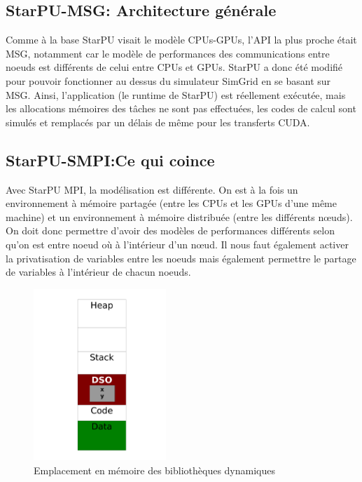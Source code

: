 \documentclass[smallextended]{svjour3}
\begin{document}
\subsection{StarPU-MSG: Architecture générale}
\label{sec-3-2}
Comme à la base StarPU visait le modèle CPUs-GPUs, l'API la plus
proche était MSG, notamment car le modèle de performances des
communications entre noeuds est différents de celui entre CPUs et
GPUs. StarPU a donc été modifié pour pouvoir fonctionner au dessus
du simulateur SimGrid en se basant sur MSG. Ainsi, l'application
(le runtime de StarPU) est réellement exécutée, mais les
allocations mémoires des tâches ne sont pas effectuées, les codes
de calcul sont simulés et remplacés par un délais de même pour les
transferts CUDA.  

\subsection{StarPU-SMPI:Ce qui coince}
\label{sec-3-3}

Avec StarPU MPI, la modélisation est différente. On est à la fois
un environnement à mémoire partagée (entre les CPUs et les GPUs
d'une même machine) et un environnement à mémoire distribuée
(entre les différents nœuds). On doit donc permettre d'avoir des
modèles de performances différents selon qu'on est entre noeud où à
l'intérieur d'un nœud. Il nous faut également activer la
privatisation de variables entre les noeuds mais également
permettre le partage de variables à l'intérieur de chacun noeuds. 

\begin{figure}
\vspace{-15mm}
\begin{center}
\includegraphics[width=5cm]{./Img/Dyn.pdf}
\end{center}
\caption{\label{fig:3}Emplacement en mémoire des bibliothèques dynamiques}
\end{figure}
\end{document}
